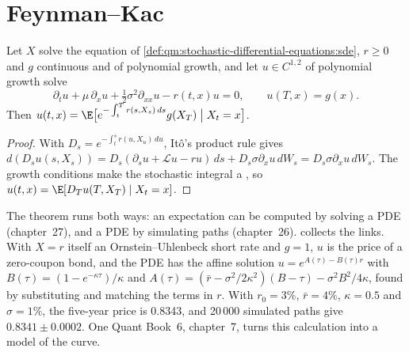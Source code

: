 \section{Feynman--Kac}

\begin{theorem}\label{thm:qm:stochastic-differential-equations:fk}
Let $X$ solve the equation of \cref{def:qm:stochastic-differential-equations:sde}, $r \ge 0$ and $g$
continuous and of polynomial growth, and let $u \in C^{1,2}$ of polynomial growth solve
\[
\partial_tu + \mu\,\partial_xu + \tfrac12\sigma^2\partial_{xx}u - r(t,x)u = 0, \qquad u(T, x) = g(x).
\]
Then $u(t, x) = \E\bigl[e^{-\int_t^Tr(s, X_s)\,ds}g(X_T) \bigm| X_t = x\bigr]$.
\end{theorem}

\begin{proof}
With $D_s = e^{-\int_t^sr(u, X_u)\,du}$, Itô's product rule gives $d(D_su(s, X_s)) = D_s(\partial_su +
\mathcal Lu - ru)\,ds + D_s\sigma\partial_xu\,dW_s = D_s\sigma\partial_xu\,dW_s$. The growth conditions make
the stochastic integral a , so $u(t, x) = \E[D_Tu(T, X_T) \mid X_t = x]$.
\end{proof}

The theorem runs both ways: an expectation can be computed by solving a PDE (chapter~27), and a
PDE by simulating paths (chapter~26). 
collects the links. With $X = r$ itself an Ornstein--Uhlenbeck short rate and $g = 1$, $u$ is the
price of a zero-coupon bond, and the PDE has the affine solution $u = e^{A(\tau) - B(\tau)r}$ with
$B(\tau) = (1 - e^{-\kappa\tau})/\kappa$ and $A(\tau) = (\bar r - \sigma^2/2\kappa^2)(B - \tau) - \sigma^2B^2/4\kappa$,
found by substituting and matching the terms in $r$. With $r_0 = 3\%$, $\bar r = 4\%$, $\kappa = 0.5$
and $\sigma = 1\%$, the five-year price is 0.8343, and 20\,000 simulated paths give $0.8341 \pm 0.0002$.
One Quant Book~6, chapter~7, turns this calculation into a model of the curve.

